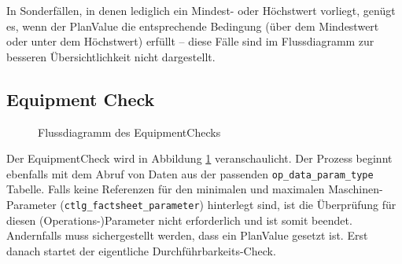 In Sonderfällen, in denen lediglich ein Mindest- oder Höchstwert vorliegt, genügt es, wenn der PlanValue die entsprechende Bedingung (über dem Mindestwert oder unter dem Höchstwert) erfüllt – diese Fälle sind im Flussdiagramm zur besseren Übersichtlichkeit nicht dargestellt.


\subsection{Equipment Check}

\begin{figure}[!htbp]
    \centering
    \caption{Flussdiagramm des \gls{EquipmentCheck}s}
    \label{fig:equipment-check}
\end{figure}

Der \gls{EquipmentCheck} wird in Abbildung \ref{fig:equipment-check} veranschaulicht. Der Prozess beginnt ebenfalls mit dem Abruf von Daten aus der passenden \texttt{op\_data\_param\_type} Tabelle. Falls keine Referenzen für den minimalen und maximalen Maschinen-Parameter (\texttt{ctlg\_\-factsheet\_\-parameter}) hinterlegt sind, ist die Überprüfung für diesen (Opera\-tions-)Parameter nicht erforderlich und ist somit beendet. Andernfalls muss sichergestellt werden, dass ein PlanValue gesetzt ist. Erst danach startet der eigentliche Durchführ\-barkeits-Check.

